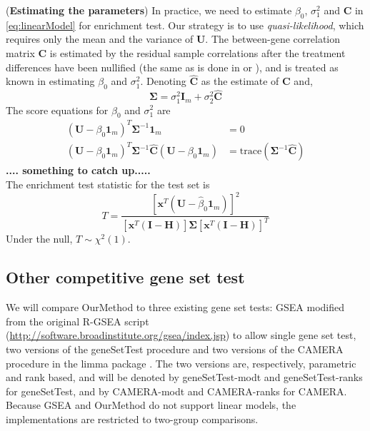 \documentclass[11pt, a4paper]{article}
\begin{document}
	(\textbf{Estimating the parameters}) In practice, we need to estimate $\beta_0$, $\sigma_1^2$ and $\bm C$ in \ref{eq:linearModel} for enrichment test.
	Our strategy is to use \textit{quasi-likelihood}, which requires only the mean and the variance of $\bm U$.  The between-gene correlation matrix $\bm C$ is estimated by the residual sample correlations after the treatment differences have been nullified (the same as is done in \cite{efron2007correlation} or \cite{wu2012camera}), and is treated as known in estimating $\beta_0$ and $\sigma_1^2$. 
	Denoting $\hat{\bm C}$ as the estimate of $\bm C$ and,
	\begin{equation}\label{eq:estimateparameter}
		\bm\Sigma = \sigma^2_1\bm I_m + \sigma_2^2 \hat{\bm C}
	\end{equation}
	The score equations for $\beta_0$ and $\sigma_1^2$ are
	\begin{equation}
		\begin{aligned}
			(\bm U - \beta_0\bm 1_m)^T \bm \Sigma^{-1}\bm 1_m & = 0\\
			(\bm U - \beta_0\bm 1_m)^T \bm \Sigma^{-1} \hat{\bm C} (\bm U - \beta_0\bm 1_m) &= \text{trace}(\bm \Sigma^{-1}\hat{\bm C})
		\end{aligned}
	\end{equation}
	\textbf{.... something to catch up.....}\\
	The enrichment test statistic for the test set is 
	\begin{equation}\label{eq:teststatistic}
		T = \frac{\left[\bm x^T(\bm U - \hat{\beta}_0 \bm 1_m )\right]^2}{\left[\bm x^T(\bm I - \bm H)\right]\bm \Sigma \left[\bm x^T(\bm I - \bm H)\right]^T}
	\end{equation} 
	Under the null, $T\sim \chi^2(1)$.
	
	\subsection{Other competitive gene set test}
	We will compare OurMethod to three existing gene set tests: GSEA \citep{subramanian2005gene} modified from the original R-GSEA script (\url{http://software.broadinstitute.org/gsea/index.jsp}) to allow single gene set test, two versions of the geneSetTest procedure and two versions of the CAMERA procedure \citep{wu2012camera}  in the limma package \citep{smyth2005limma}. The two versions are, respectively, parametric and rank based,  and will be denoted by geneSetTest-modt and geneSetTest-ranks for geneSetTest, and by CAMERA-modt and CAMERA-ranks for CAMERA. Because GSEA and OurMethod do not support linear models, the implementations are restricted to two-group comparisons.
	
\end{document}

